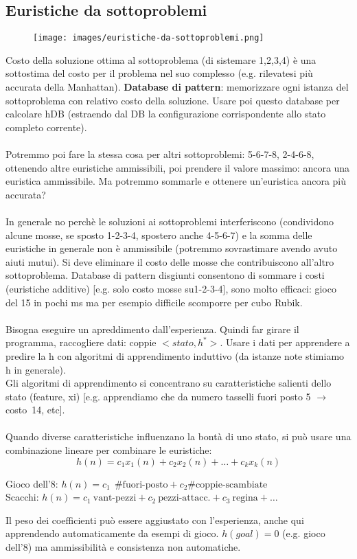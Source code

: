 \subsection{Euristiche da sottoproblemi}
\begin{figure}[h!]
    \centering
    \texttt{[image: images/euristiche-da-sottoproblemi.png]}
\end{figure}
Costo della soluzione ottima al sottoproblema (di sistemare 1,2,3,4) è una sottostima del costo per il problema nel suo
complesso (e.g. rilevatesi più accurata della Manhattan). \textbf{Database di pattern}: memorizzare ogni istanza del
sottoproblema con relativo costo della soluzione. Usare poi questo database per calcolare hDB (estraendo dal DB la
configurazione corrispondente allo stato completo corrente).\\\\
Potremmo poi fare la stessa cosa per altri sottoproblemi: 5-6-7-8, 2-4-6-8, ottenendo altre euristiche ammissibili,
poi prendere il valore massimo: ancora una euristica ammissibile. Ma potremmo sommarle e ottenere un’euristica
ancora più accurata?\\\\
In generale no perchè le soluzioni ai sottoproblemi interferiscono (condividono alcune mosse, se sposto 1-2-3-4, spostero
anche 4-5-6-7) e la somma delle euristiche in generale non è ammissibile (potremmo sovrastimare avendo avuto aiuti mutui).
Si deve eliminare il costo delle mosse che contribuiscono all’altro sottoproblema. Database di pattern disgiunti consentono di sommare i
costi (euristiche additive) [e.g. solo costo mosse su1-2-3-4], sono molto efficaci: gioco del 15 in pochi ms
ma per esempio difficile scomporre per cubo Rubik.\\\\
Bisogna eseguire un apreddimento dall'esperienza. Quindi far girare il programma, raccogliere dati: coppie
$<stato, h^*>$. Usare i dati per apprendere a predire la h con algoritmi di apprendimento induttivo (da istanze note stimiamo h in generale).\\
Gli algoritmi di apprendimento si concentrano su caratteristiche salienti dello stato (feature, xi) [e.g.
apprendiamo che da numero tasselli fuori posto 5 $\to$ costo~14, etc].\\\\
Quando diverse caratteristiche influenzano la bontà di uno stato, si può usare una combinazione lineare per combinare le euristiche:
$$h(n) = c_1 x_1(n) + c_2x_2(n) + \dots + c_k x_k(n)$$
\begin{example}
    Gioco dell'8: $h(n) = c_1 \:\: \#\text{fuori-posto} + c_2 \#\text{coppie-scambiate}$\\
    Scacchi: $h(n) = c_1 \:\text{vant-pezzi} + c_2 \:\text{pezzi-attacc.} + c_3 \:\text{regina} + \dots$
\end{example}
\hspace{-15pt}Il peso dei coefficienti può essere aggiustato con l’esperienza, anche qui apprendendo automaticamente da esempi di gioco.
$h(goal) = 0$ (e.g. gioco dell’8) ma ammissibilità e consistenza non automatiche.

